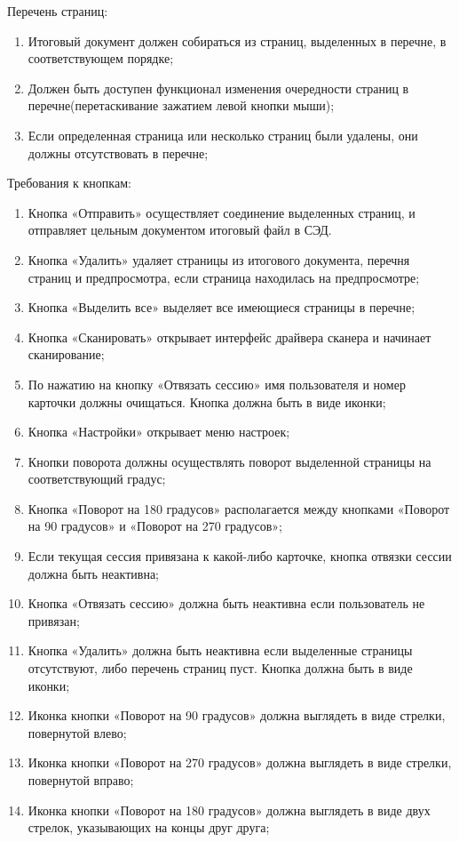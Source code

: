 Перечень страниц: 
\begin{enumerate}
	\item Итоговый документ должен собираться из страниц, выделенных в перечне, в соответствующем порядке; 
	\item Должен быть доступен функционал изменения очередности страниц в перечне(перетаскивание зажатием левой кнопки мыши); 
	\item Если определенная страница или несколько страниц были удалены, они должны отсутствовать в перечне;
\end{enumerate}

Требования к кнопкам:
\begin{enumerate}
	\item Кнопка «Отправить» осуществляет соединение выделенных страниц, и отправляет цельным документом итоговый файл в СЭД.
	\item Кнопка «Удалить» удаляет страницы из итогового документа, перечня страниц и предпросмотра, если страница находилась на предпросмотре;
	\item Кнопка «Выделить все» выделяет все имеющиеся страницы в перечне;
	\item Кнопка «Сканировать» открывает интерфейс драйвера сканера и начинает сканирование;
	\item По нажатию на кнопку «Отвязать сессию» имя пользователя и номер карточки должны очищаться. Кнопка должна быть в виде иконки;
	\item Кнопка «Настройки» открывает меню настроек;
	\item Кнопки поворота должны осуществлять поворот выделенной страницы на соответствующий градус;
	\item Кнопка «Поворот на 180 градусов» располагается между кнопками «Поворот на 90 градусов» и «Поворот на 270 градусов»;
	\item Если текущая сессия привязана к какой-либо карточке, кнопка отвязки сессии должна быть неактивна;
	\item Кнопка «Отвязать сессию» должна быть неактивна если пользователь не привязан;
	\item Кнопка «Удалить» должна быть неактивна если выделенные страницы отсутствуют, либо перечень страниц пуст. Кнопка должна быть в виде иконки;
	\item Иконка кнопки «Поворот на 90 градусов» должна выглядеть в виде стрелки, повернутой влево;
	\item Иконка кнопки «Поворот на 270 градусов» должна выглядеть в виде стрелки, повернутой вправо;
	\item Иконка кнопки «Поворот на 180 градусов» должна выглядеть в виде двух стрелок, указывающих на концы друг друга;
\end{enumerate}


